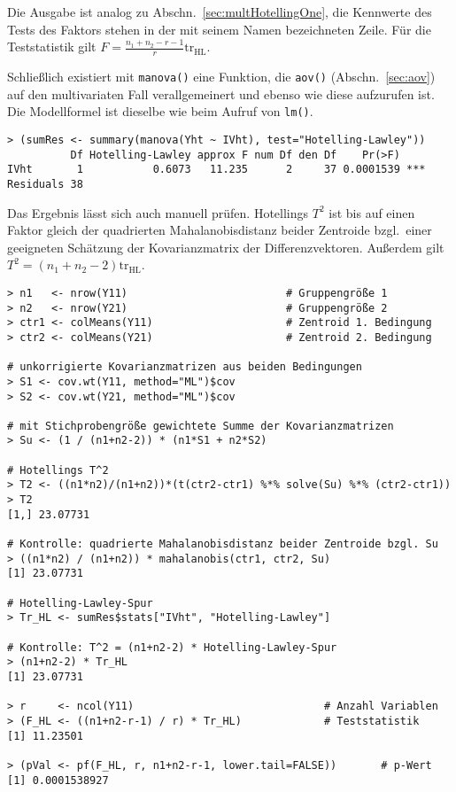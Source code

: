 Die Ausgabe ist analog zu Abschn.\ \ref{sec:multHotellingOne}, die Kennwerte des Tests des Faktors stehen in der mit seinem Namen bezeichneten Zeile. Für die Teststatistik gilt $F = \frac{n_{1} + n_{2}-r-1}{r} \text{tr}_{\text{HL}}$.

Schließlich existiert mit \lstinline!manova()! eine Funktion, die \lstinline!aov()! (Abschn.\ \ref{sec:aov}) auf den multivariaten Fall verallgemeinert und ebenso wie diese aufzurufen ist. Die Modellformel ist dieselbe wie beim Aufruf von \lstinline!lm()!.
\begin{lstlisting}
> (sumRes <- summary(manova(Yht ~ IVht), test="Hotelling-Lawley"))
          Df Hotelling-Lawley approx F num Df den Df    Pr(>F)
IVht       1           0.6073   11.235      2     37 0.0001539 ***
Residuals 38
\end{lstlisting}

Das Ergebnis lässt sich auch manuell prüfen. Hotellings $T^{2}$ ist bis auf einen Faktor gleich der quadrierten Mahalanobisdistanz beider Zentroide bzgl.\ einer geeigneten Schätzung der Kovarianzmatrix der Differenzvektoren. Außerdem gilt $T^{2} = (n_{1}+n_{2}-2) \text{tr}_{\text{HL}}$.
\begin{lstlisting}
> n1   <- nrow(Y11)                         # Gruppengröße 1
> n2   <- nrow(Y21)                         # Gruppengröße 2
> ctr1 <- colMeans(Y11)                     # Zentroid 1. Bedingung
> ctr2 <- colMeans(Y21)                     # Zentroid 2. Bedingung

# unkorrigierte Kovarianzmatrizen aus beiden Bedingungen
> S1 <- cov.wt(Y11, method="ML")$cov
> S2 <- cov.wt(Y21, method="ML")$cov

# mit Stichprobengröße gewichtete Summe der Kovarianzmatrizen
> Su <- (1 / (n1+n2-2)) * (n1*S1 + n2*S2)

# Hotellings T^2
> T2 <- ((n1*n2)/(n1+n2))*(t(ctr2-ctr1) %*% solve(Su) %*% (ctr2-ctr1))
> T2
[1,] 23.07731

# Kontrolle: quadrierte Mahalanobisdistanz beider Zentroide bzgl. Su
> ((n1*n2) / (n1+n2)) * mahalanobis(ctr1, ctr2, Su)
[1] 23.07731

# Hotelling-Lawley-Spur
> Tr_HL <- sumRes$stats["IVht", "Hotelling-Lawley"]

# Kontrolle: T^2 = (n1+n2-2) * Hotelling-Lawley-Spur
> (n1+n2-2) * Tr_HL
[1] 23.07731

> r     <- ncol(Y11)                              # Anzahl Variablen
> (F_HL <- ((n1+n2-r-1) / r) * Tr_HL)             # Teststatistik
[1] 11.23501

> (pVal <- pf(F_HL, r, n1+n2-r-1, lower.tail=FALSE))       # p-Wert
[1] 0.0001538927
\end{lstlisting}

